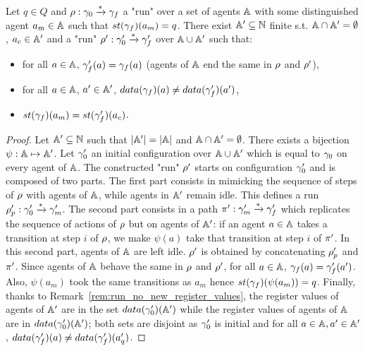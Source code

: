 \begin{lemma}\label{lem:weak_copycat}
Let $q \in Q$ and  $\rho : \gamma_0 \xrightarrow{*} \gamma_f$ a "run" over a set of agents $\mathbb{A}$ with some distinguished agent $a_m \in \mathbb{A}$ such that $\st{\config_f}(a_m) = q$. There exist $\mathbb{A}' \subseteq \mathbb{N}$ finite s.t. $\mathbb{A} \cap \mathbb{A}' = \emptyset$, $a_c \in \mathbb{A}'$ and a "run" $\rho': \gamma_0' \xrightarrow{*} \gamma_f'$ over $\mathbb{A} \cup \mathbb{A}'$ such that:
\begin{itemize}
\item for all $a \in \mathbb{A}$, $\gamma_f'(a) = \gamma_f(a)$ (agents of $\mathbb{A}$ end the same in $\rho$ and $\rho'$),
\item for all $a \in \mathbb{A}$, $a' \in \mathbb{A}'$, $\data{\config_f}(a) \ne \data{\config_f'}(a')$,
\item $\st{\config_f}(a_m) = \st{\config_f'}(a_c)$.
\end{itemize}
\end{lemma}


\ifproofs
\begin{proof}
Let $\mathbb{A}' \subseteq \mathbb{N}$ such that $|\mathbb{A}'|= |\mathbb{A}|$ and $\mathbb{A} \cap \mathbb{A}' = \emptyset$.
There exists a bijection $\psi: \mathbb{A} \mapsto \mathbb{A}'$. Let $\gamma_0'$ an initial configuration over $\mathbb{A} \cup \mathbb{A}'$ which is equal to $\gamma_0$ on every agent of $\mathbb{A}$. 
The constructed "run" $\rho'$ starts on configuration $\gamma_0'$ and is composed of two parts. 
The first part consists in mimicking the sequence of steps of $\rho$ with agents of $\mathbb{A}$, while agents in $\mathbb{A}'$ remain idle. This defines a run $\rho_p' : \gamma_0' \xrightarrow{*}  \gamma_m'$.  
The second part consists in a path $\pi': \gamma_m' \xrightarrow{*} \gamma_f'$ which replicates the sequence of actions of $\rho$ but on agents of $\mathbb{A}'$: if an agent $a \in \mathbb{A}$ takes a transition at step $i$ of $\rho$, we make $\psi(a)$ take that transition at step $i$ of $\pi'$.
In this second part, agents of $\mathbb{A}$ are left idle. $\rho'$ is obtained by concatenating $\rho_p'$ and $\pi'$. Since agents of $\mathbb{A}$ behave the same in $\rho$ and $\rho'$, for all $a \in \mathbb{A}$, $\gamma_f(a) = \gamma_f'(a')$. Also, $\psi(a_m)$ took the same transitions as $a_m$ hence $\st{\config_f}(\psi(a_m)) = q$. Finally, thanks to Remark~\ref{rem:run_no_new_register_values}, the register values of agents of $\mathbb{A}'$ are in the set $\data{\config_0'}(\agents')$ while the register values of agents of $\mathbb{A}$ are in $\data{\config_0'}(\agents')$; both sets are disjoint as $\gamma_0'$ is initial and for all $a \in \mathbb{A}, a' \in \mathbb{A}'$, $\data{\config_f'}(a) \ne \data{\config_f'}(a'_q)$.
\end{proof}
\fi


